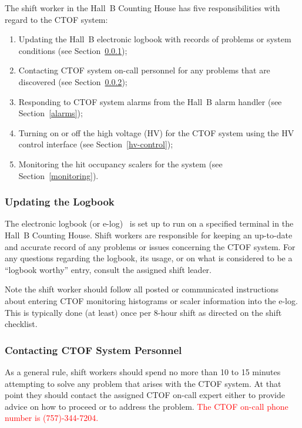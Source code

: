 \documentclass[12pt]{article}
\begin{document}
The shift worker in the Hall~B Counting House has five responsibilities with regard to the CTOF system:

\begin{enumerate}
\item Updating the Hall~B electronic logbook with records of problems or system conditions (see
Section~\ref{logbook});

\item Contacting CTOF system on-call personnel for any problems that are discovered (see
Section~\ref{contact});

\item Responding to CTOF system alarms from the Hall~B alarm handler (see Section~\ref{alarms});

\item Turning on or off the high voltage (HV) for the CTOF system using the HV control interface (see
Section~\ref{hv-control});

\item Monitoring the hit occupancy scalers for the system (see Section~\ref{monitoring}).
\end{enumerate}

\subsubsection{Updating the Logbook}
\label{logbook}

The electronic logbook (or e-log)~\cite{e-log} is set up to run on a specified terminal in the Hall~B Counting
House. Shift workers are responsible for keeping an up-to-date and accurate record of any problems or
issues concerning the CTOF system. For any questions regarding the logbook, its usage, or on what is 
considered to be a ``logbook worthy'' entry, consult the assigned shift leader.

Note the shift worker should follow all posted or communicated instructions about entering CTOF monitoring
histograms or scaler information into the e-log. This is typically done (at least) once per 8-hour shift as
directed on the shift checklist.

\subsubsection{Contacting CTOF System Personnel}
\label{contact}

As a general rule, shift workers should spend no more than 10 to 15 minutes attempting to solve any problem
that arises with the CTOF system. At that point they should contact the assigned CTOF on-call expert either
to provide advice on how to proceed or to address the problem. \textcolor{red}{The CTOF on-call phone 
number is (757)-344-7204.}
\end{document}
